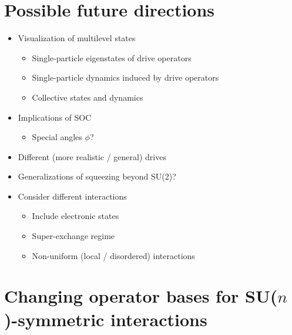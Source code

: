 \documentclass[nofootinbib,notitlepage,11pt]{revtex4-2}
\newcommand{\1}{\mathds{1}}
\begin{document}
\section{Possible future directions}

\begin{itemize}
\item Visualization of multilevel states
  \begin{itemize}
  \item Single-particle eigenstates of drive operators
  \item Single-particle dynamics induced by drive operators
  \item Collective states and dynamics
  \end{itemize}
\item Implications of SOC
  \begin{itemize}
  \item Special angles $\phi$?
  \end{itemize}
\item Different (more realistic / general) drives
\item Generalizations of squeezing beyond SU(2)?
\item Consider different interactions
  \begin{itemize}
  \item Include electronic states
  \item Super-exchange regime
  \item Non-uniform (local / disordered) interactions
  \end{itemize}
\end{itemize}

\appendix

\section{Changing operator bases for SU($n$)-symmetric interactions}
\label{sec:changing_bases}
\end{document}
